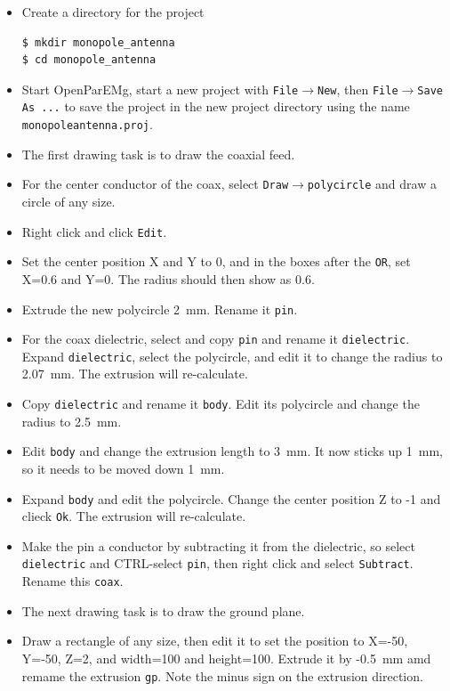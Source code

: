 \documentclass[titlepage]{article}
\renewcommand\_{\textunderscore\linebreak[1]}
\begin{document}
\begin{itemize}
\item Create a directory for the project
\begin{Verbatim}[fontsize=\small]
$ mkdir monopole_antenna
$ cd monopole_antenna
\end{Verbatim}
\item Start OpenParEMg, start a new project with \texttt{File}$\rightarrow$\texttt{New}, then \texttt{File}$\rightarrow$\texttt{Save As ...} to save the project in the new project directory using the name \texttt{monopole\_antenna.proj}.
\item The first drawing task is to draw the coaxial feed.
\item For the center conductor of the coax, select \texttt{Draw}$\rightarrow$\texttt{polycircle} and draw a circle of any size.
\item Right click and click \texttt{Edit}.
\item Set the center position X and Y to 0, and in the boxes after the \texttt{OR}, set X=0.6 and Y=0. The radius should then show as 0.6.
\item Extrude the new polycircle 2~mm.  Rename it \texttt{pin}.
\item For the coax dielectric, select and copy \texttt{pin} and rename it \texttt{dielectric}.  Expand \texttt{dielectric}, select the polycircle, and edit it to change the radius to 2.07~mm.  The extrusion will re-calculate.
\item Copy \texttt{dielectric} and rename it \texttt{body}.  Edit its polycircle and change the radius to 2.5~mm.
\item Edit \texttt{body} and change the extrusion length to 3~mm.  It now sticks up 1~mm, so it needs to be moved down 1~mm.
\item Expand \texttt{body} and edit the polycircle.  Change the center position Z to -1 and clieck \texttt{Ok}.  The extrusion will re-calculate.
\item Make the pin a conductor by subtracting it from the dielectric, so select \texttt{dielectric} and CTRL-select \texttt{pin}, then right click and select \texttt{Subtract}.  Rename this \texttt{coax}.
\item The next drawing task is to draw the ground plane.
\item Draw a rectangle of any size, then edit it to set the position to X=-50, Y=-50, Z=2, and width=100 and height=100. Extrude it by -0.5~mm amd remame the extrusion \texttt{gp}. Note the minus sign on the extrusion direction.

\end{itemize}
\end{document}
